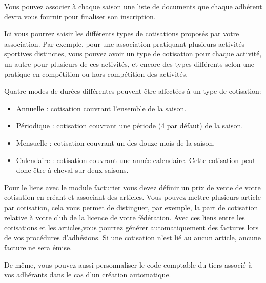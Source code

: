 \documentclass[a4paper,10pt,oneside,french]{sphinxmanual}
\begin{document}
Vous pouvez associer à chaque saison une liste de documents que chaque adhérent devra vous fournir pour finaliser son inscription.
\begin{quote}

\noindent{}
\end{quote}

\begin{quote}

\noindent{}
\end{quote}

Ici vous pourrez saisir les différents types de cotisations proposés par votre association. Par exemple, pour une association pratiquant plusieurs activités sportives distinctes, vous pouvez avoir un type de cotisation pour chaque activité, un autre pour plusieurs de ces activités, et encore des types différents selon une pratique en compétition ou hors compétition des activités.

Quatre modes de durées différentes peuvent être affectées à un type de cotisation:
\begin{itemize}
\item {} 
Annuelle : cotisation couvrant l’ensemble de la saison.

\item {} 
Périodique : cotisation couvrant une période (4 par défaut) de la saison.

\item {} 
Mensuelle : cotisation couvrant un des douze mois de la saison.

\item {} 
Calendaire : cotisation couvrant une année calendaire. Cette cotisation peut donc être à cheval sur deux saisons.

\end{itemize}

Pour le liens avec le module facturier vous devez définir un prix de vente de votre cotisation en créant et associant des articles.
Vous pouvez mettre plusieurs article par cotisation, cela vous permet de distinguer, par exemple, la part de cotisation relative à votre club de la licence de votre fédération.
Avec ces liens entre les cotisations et les articles,vous pourrez générer automatiquement des factures lors de vos procédures d’adhésions. Si une cotisation n’est lié au aucun article, aucune facture ne sera émise.

De même, vous pouvez aussi personnaliser le code comptable du tiers associé à vos adhérants dans le cas d’un création automatique.
\end{document}
